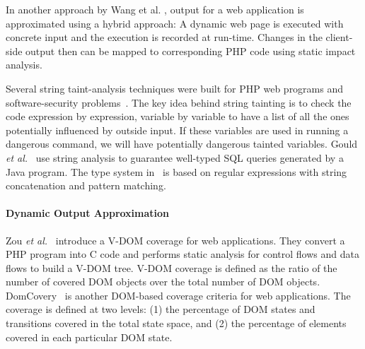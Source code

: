In another approach by Wang et al. \cite{wang_automating_2012}, 
output for a web application is approximated using a hybrid approach: A
dynamic web page is executed with concrete input and the execution is
recorded at run-time. Changes in the client-side output then can be mapped to 
corresponding PHP code using static impact analysis.

Several string taint-analysis techniques were built for PHP web
programs and software-security
problems~\cite{kieyzun09,su-icse08,xieaiken06,tevfik11}.  The key idea
behind string tainting is to check the code expression by expression,
variable by variable to have a list of all the ones potentially
influenced by outside input.  If these variables are used in running a
dangerous command, we will have potentially dangerous tainted
variables.
%
Gould {\em et al.}~\cite{gould04} use string analysis to guarantee
well-typed SQL queries generated by a Java program. The type system
in~\cite{tabuchi03} is based on regular expressions with string
concatenation and pattern matching.

\paragraph{Dynamic Output Approximation}
Zou {\em et al.}~\cite{zou-issta14} introduce a V-DOM coverage for web
applications. They convert a PHP program into C code and performs
static analysis for control flows and data flows to build a V-DOM
tree. V-DOM coverage is defined as the ratio of the number of covered
DOM objects over the total number of DOM
objects. DomCovery~\cite{mesbah-issta14} is another DOM-based coverage
criteria for web applications. The coverage is defined at two levels:
(1) the percentage of DOM states and transitions covered in the total
state space, and (2) the percentage of elements covered in each
particular DOM state.


